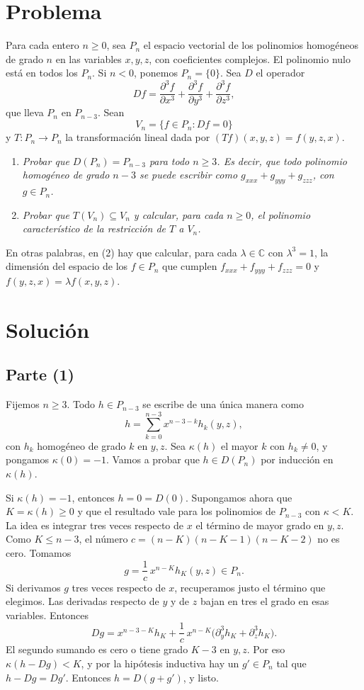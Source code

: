 \documentclass[11pt]{amsproc}
\newcommand{\C}{\mathbb{C}}
\begin{document}
\section*{Problema}

Para cada entero $n\ge 0$, sea $P_n$ el espacio vectorial de los polinomios
homogéneos de grado $n$ en las variables $x,y,z$, con coeficientes complejos.
El polinomio nulo está en todos los $P_n$. Si $n<0$, ponemos $P_n=\{0\}$.
Sea $D$ el operador
\[
  Df=\frac{\partial^3 f}{\partial x^3}+\frac{\partial^3 f}{\partial y^3}
      +\frac{\partial^3 f}{\partial z^3},
\]
que lleva $P_n$ en $P_{n-3}$. Sean
\[
  V_n=\{f\in P_n : Df=0\}
\]
y $T\colon P_n\to P_n$ la transformación lineal dada por
$(Tf)(x,y,z)=f(y,z,x)$.

\begin{enumerate}
  \item\itshape Probar que $D(P_n)=P_{n-3}$ para todo $n\ge 3$. Es decir, que
        todo polinomio homogéneo de grado $n-3$ se puede escribir como
        $g_{xxx}+g_{yyy}+g_{zzz}$, con $g\in P_n$.
  \item\itshape Probar que $T(V_n)\subseteq V_n$ y calcular, para cada
        $n\ge 0$, el polinomio característico de la restricción de $T$ a
        $V_n$.
\end{enumerate}

En otras palabras, en (2) hay que calcular, para cada $\lambda\in\C$ con
$\lambda^3=1$, la dimensión del espacio de los $f\in P_n$ que cumplen
$f_{xxx}+f_{yyy}+f_{zzz}=0$ y $f(y,z,x)=\lambda f(x,y,z)$.

\section*{Solución}

\subsection*{Parte (1)}

Fijemos $n\ge 3$. Todo $h\in P_{n-3}$ se escribe de una única manera como
\[
  h=\sum_{k=0}^{n-3}x^{n-3-k}h_k(y,z),
\]
con $h_k$ homogéneo de grado $k$ en $y,z$. Sea $\kappa(h)$ el mayor $k$ con
$h_k\ne 0$, y pongamos $\kappa(0)=-1$. Vamos a probar que $h\in D(P_n)$ por
inducción en $\kappa(h)$.

Si $\kappa(h)=-1$, entonces $h=0=D(0)$. Supongamos ahora que
$K=\kappa(h)\ge 0$ y que el resultado vale para los polinomios de $P_{n-3}$
con $\kappa<K$. La idea es integrar tres veces respecto de $x$ el término de
mayor grado en $y,z$. Como $K\le n-3$, el número
$c=(n-K)(n-K-1)(n-K-2)$ no es cero. Tomamos
\[
  g=\frac{1}{c}\,x^{n-K}h_K(y,z)\in P_n .
\]
Si derivamos $g$ tres veces respecto de $x$, recuperamos justo el término que
elegimos. Las derivadas respecto de $y$ y de $z$ bajan en tres el grado en
esas variables. Entonces
\[
  Dg=x^{n-3-K}h_K+\frac{1}{c}\,x^{n-K}
        \bigl(\partial_y^3h_K+\partial_z^3h_K\bigr).
\]
El segundo sumando es cero o tiene grado $K-3$ en $y,z$. Por eso
$\kappa(h-Dg)<K$, y por la hipótesis inductiva hay un $g'\in P_n$ tal que
$h-Dg=Dg'$. Entonces $h=D(g+g')$, y listo.
\end{document}
